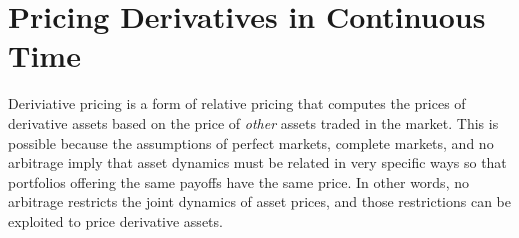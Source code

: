 \documentclass[12pt]{article}
\theoremstyle{plain}
\theoremstyle{definition}
\theoremstyle{remark}
\begin{document}







\clearpage
\section{Pricing Derivatives in Continuous Time}

Deriviative pricing is a form of relative pricing that computes the
prices of derivative assets based on the price of \emph{other} assets
traded in the market. This is possible because the assumptions of
perfect markets, complete markets, and no arbitrage imply that asset
dynamics must be related in very specific ways so that portfolios
offering the same payoffs have the same price. In other words, no
arbitrage restricts the joint dynamics of asset prices, and those
restrictions can be exploited to price derivative assets.
\end{document}
